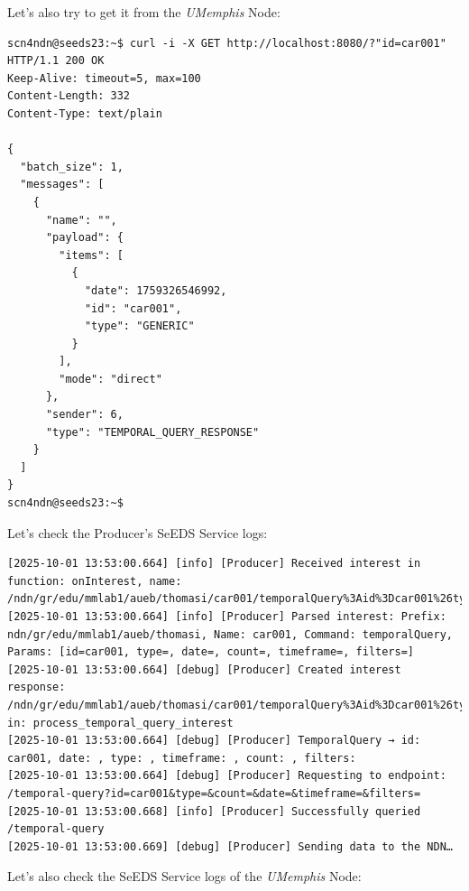 \documentclass{article}
\begin{document}
Let's also try to get it from the \emph{UMemphis} Node: 

\begin{lstlisting}[language=curl, caption={HTTP Request for \textit{@id=car001} }, label={lst:umemphis-http-request-car001}]
scn4ndn@seeds23:~$ curl -i -X GET http://localhost:8080/?"id=car001"
HTTP/1.1 200 OK
Keep-Alive: timeout=5, max=100
Content-Length: 332
Content-Type: text/plain

{
  "batch_size": 1,
  "messages": [
    {
      "name": "",
      "payload": {
        "items": [
          {
            "date": 1759326546992,
            "id": "car001",
            "type": "GENERIC"
          }
        ],
        "mode": "direct"
      },
      "sender": 6,
      "type": "TEMPORAL_QUERY_RESPONSE"
    }
  ]
}
scn4ndn@seeds23:~$  
\end{lstlisting}

Let's check the Producer's SeEDS Service logs: 

\begin{lstlisting}[language=log, caption={Logs after receiving GET by ID request from node \emph{UMemphis}}, label={lst:producer-get-by-id-after-umemphis}]
[2025-10-01 13:53:00.664] [info] [Producer] Received interest in function: onInterest, name: /ndn/gr/edu/mmlab1/aueb/thomasi/car001/temporalQuery%3Aid%3Dcar001%26type%3D%26date%3D%26count%3D%26timeframe%3D%26filters%3D
[2025-10-01 13:53:00.664] [info] [Producer] Parsed interest: Prefix: ndn/gr/edu/mmlab1/aueb/thomasi, Name: car001, Command: temporalQuery, Params: [id=car001, type=, date=, count=, timeframe=, filters=]
[2025-10-01 13:53:00.664] [debug] [Producer] Created interest response: /ndn/gr/edu/mmlab1/aueb/thomasi/car001/temporalQuery%3Aid%3Dcar001%26type%3D%26date%3D%26count%3D%26timeframe%3D%26filters%3D in: process_temporal_query_interest
[2025-10-01 13:53:00.664] [debug] [Producer] TemporalQuery → id: car001, date: , type: , timeframe: , count: , filters: 
[2025-10-01 13:53:00.664] [debug] [Producer] Requesting to endpoint: /temporal-query?id=car001&type=&count=&date=&timeframe=&filters=
[2025-10-01 13:53:00.668] [info] [Producer] Successfully queried /temporal-query
[2025-10-01 13:53:00.669] [debug] [Producer] Sending data to the NDN… 
\end{lstlisting}

Let's also check the SeEDS Service logs of the \emph{UMemphis} Node: 
\end{document}

